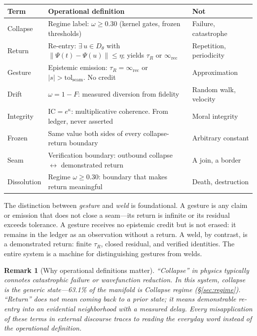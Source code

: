 \documentclass[
  aps,
  prd,
  twocolumn,
  superscriptaddress,
  nofootinbib,
  floatfix
]{revtex4-2}
\newtheorem{remark}{Remark}
\newcommand{\tR}{\tau_{\!R}}
\newcommand{\IR}{\infty_{\mathrm{rec}}}
\newcommand{\tolseam}{\mathrm{tol}_{\mathrm{seam}}}
\newcommand{\IC}{\mathrm{IC}}
\begin{document}
\begin{center}
{\small\begin{tabular}{@{}lp{3.3cm}l@{}}
\toprule
\textbf{Term} & \textbf{Operational definition} & \textbf{Not} \\
\midrule
Collapse & Regime label: $\omega \geq 0.30$ (kernel gates, frozen thresholds) & Failure, catastrophe \\
Return & Re-entry: $\exists\, u \in D_\theta$ with $\|\Psi(t){-}\Psi(u)\| \leq \eta$; yields $\tR$ or $\IR$ & Repetition, periodicity \\
Gesture & Epistemic emission: $\tR = \IR$ or $|s| > \tolseam$.  No credit & Approximation \\
Drift & $\omega = 1{-}F$: measured diversion from fidelity & Random walk, velocity \\
Integrity & $\IC = e^\kappa$: multiplicative coherence.  From ledger, never asserted & Moral integrity \\
Frozen & Same value both sides of every collapse-return boundary & Arbitrary constant \\
Seam & Verification boundary: outbound collapse $\leftrightarrow$ demonstrated return & A join, a border \\
Dissolution & Regime $\omega \geq 0.30$: boundary that makes return meaningful & Death, destruction \\
\bottomrule
\end{tabular}}
\end{center}

\noindent The distinction between \emph{gesture} and \emph{weld}
is foundational.  A gesture is any claim or emission that does not
close a seam---its return is infinite or its residual exceeds
tolerance.  A gesture receives no epistemic credit but is not
erased: it remains in the ledger as an observation without a
return.  A weld, by contrast, is a demonstrated return: finite
$\tR$, closed residual, and verified identities.  The entire
system is a machine for distinguishing gestures from welds.

\begin{remark}[Why operational definitions matter]
``Collapse'' in physics typically connotes catastrophic failure
or wavefunction reduction.  In this system, collapse is the
generic state---63.1\% of the manifold is Collapse regime
(\S\ref{sec:regime}).  ``Return'' does not mean coming back to
a prior state; it means demonstrable re-entry into an
evidential neighborhood with a measured delay.  Every
misapplication of these terms in external discourse traces to
reading the everyday word instead of the operational definition.
\end{remark}
\end{document}
